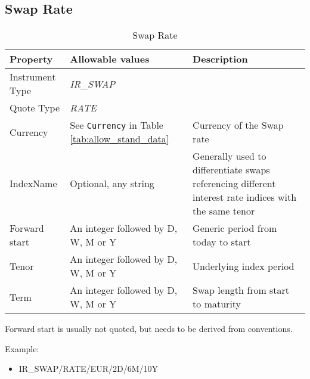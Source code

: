 


\subsection{Swap Rate}

\begin{table}[H]
\centering
  \begin{tabular}{|p{3cm}|p{3.5cm}|p{7cm}|}
    \hline
    {\bf Property} & {\bf Allowable values} & {\bf Description} \\ \hline
    Instrument Type & \emph{IR\_SWAP} & \\ \hline
    Quote Type & \emph{RATE} & \\ \hline
    Currency & See \lstinline!Currency! in Table \ref{tab:allow_stand_data} & Currency of the Swap rate\\ \hline
    IndexName & Optional, any string & Generally used to differentiate swaps referencing different interest rate indices with the same tenor\\ \hline
    Forward start & An integer followed by D, W, M or Y & Generic period from today to start\\ \hline
    Tenor & An integer followed by D, W, M or Y & Underlying index period \\ \hline
    Term & An integer followed by D, W, M or Y & Swap length from start to maturity\\ \hline
  \end{tabular}
  \caption{Swap Rate}
  \label{tab:swaprate_quote}
\end{table}


Forward start is usually not quoted, but needs to be derived from conventions.

\medskip
Example:
\begin{itemize}
\item {IR\_SWAP/RATE/EUR/2D/6M/10Y}
\end{itemize}


